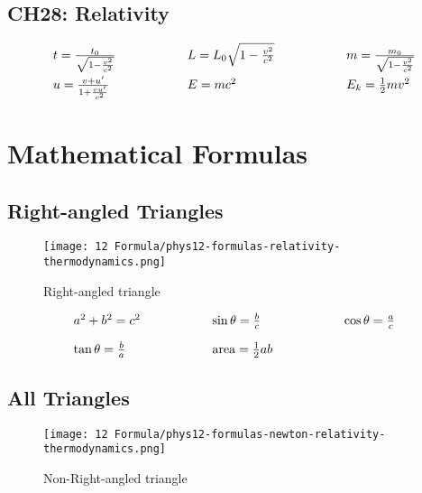\documentclass[12pt,a4paper]{article}
\begin{document}
\subsection{CH28: Relativity}
\begin{align*}
  \begin{array}{l@{\hspace{2cm}}l@{\hspace{2cm}}l}
    t = \frac{t_0}{\sqrt{1-\frac{v^2}{c^2}}} & L = L_0\sqrt{1-\frac{v^2}{c^2}} & m = \frac{m_0}{\sqrt{1-\frac{v^2}{c^2}}} \\[1em]
    u = \frac{v+u'}{1+\frac{vu'}{c^2}} & E = mc^2 & E_k = \frac{1}{2}mv^2
  \end{array}
\end{align*}


\fi


\newpage
\section{Mathematical Formulas}

\subsection{Right-angled Triangles}

\begin{figure}[H]
    \centering
    \texttt{[image: 12 Formula/phys12-formulas-relativity-thermodynamics.png]}
    \caption{Right-angled triangle}
    \label{fig:Right-angled triangle}
\end{figure}

\begin{align*}
  \begin{array}{l@{\hspace{2cm}}l@{\hspace{2cm}}l}
    a^2 + b^2 = c^2 & \sin \theta = \frac{b}{c} & \cos \theta = \frac{a}{c} \\[1em]
    \tan \theta = \frac{b}{a} & \text{area} = \frac{1}{2}ab &
  \end{array}
\end{align*}

\subsection{All Triangles}
\begin{figure}[H]
    \centering
    \texttt{[image: 12 Formula/phys12-formulas-newton-relativity-thermodynamics.png]}
    \caption{Non-Right-angled triangle}
    \label{fig:Non-Right-angled triangle}
\end{figure}
\end{document}
